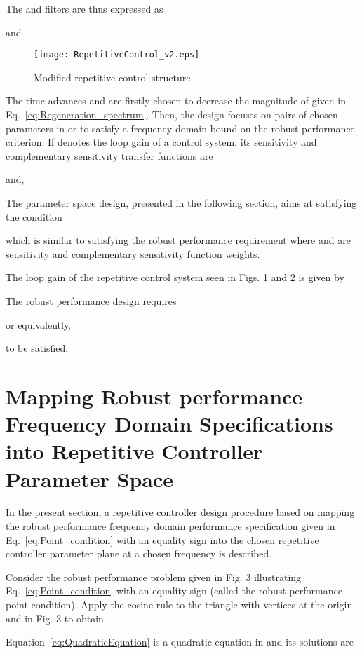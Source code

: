 \documentclass[12pt,draftcls,onecolumn]{IEEEtran}
\begin{document}
The  and  filters are thus expressed as

and


\begin{figure}\centering
    \texttt{[image: RepetitiveControl\_v2.eps]}\\
    \caption{Modified repetitive control structure.}\end{figure}


The time advances  and  are firstly chosen to decrease the magnitude of  given in Eq.~\eqref{eq:Regeneration_spectrum}. Then, the
design focuses on pairs of chosen parameters in  or  to satisfy a frequency domain bound on the robust performance criterion. If  denotes the loop gain of a control system, its sensitivity and complementary sensitivity transfer functions are

and,


The parameter space design, presented in the following section, aims at satisfying the condition

which is similar to satisfying the robust performance requirement  where  and  are sensitivity and complementary sensitivity function weights.

The loop gain of the repetitive control system seen in Figs. 1 and 2 is given by


The robust performance design requires

or equivalently,

to be satisfied.


\section{Mapping Robust performance Frequency Domain Specifications into Repetitive Controller Parameter Space}

In the present section, a repetitive controller design procedure based on mapping the robust performance frequency domain performance specification given in Eq.~\eqref{eq:Point_condition} with an equality sign into the chosen repetitive controller parameter plane at a chosen frequency is described.

Consider the robust performance problem given in Fig. 3 illustrating Eq.~\eqref{eq:Point_condition} with an equality sign (called the robust performance point condition). Apply the cosine rule to the triangle with vertices at the origin,  and  in Fig. 3 to obtain


Equation~\eqref{eq:QuadraticEquation} is a quadratic equation in  and its solutions are
\end{document}
